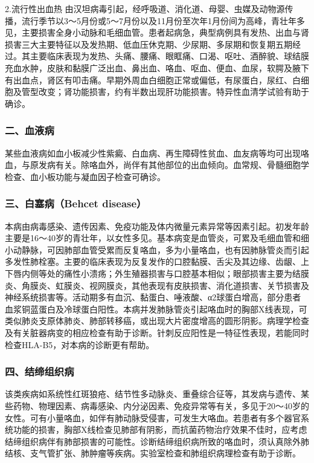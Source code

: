 2.流行性出血热
由汉坦病毒引起，经呼吸道、消化道、母婴、虫媒及动物源传播，流行季节以3～5月份或5～7月份以及11月份至次年1月份间为高峰，青壮年多见，主要损害全身小动脉和毛细血管。患者起病急，典型病例具有发热、出血与肾损害三大主要特征以及发热期、低血压休克期、少尿期、多尿期和恢复期五期经过。其主要临床表现为发热、头痛、腰痛、眼眶痛、口渴、呕吐、酒醉貌、球结膜充血水肿，皮肤和黏膜广泛出血、鼻出血、咯血、呕血、便血、血尿，软腭及腋下有出血点，肾区有叩击痛。早期外周血白细胞正常或偏低，有尿蛋白，尿红、白细胞及管型改变；肾功能损害，约有半数出现肝功能损害。特异性血清学试验有助于确诊。

\subsubsection{二、血液病}

某些血液病如血小板减少性紫癜、白血病、再生障碍性贫血、血友病等均可出现咯血，与原发病有关。除咯血外，尚伴有其他部位的出血倾向。血常规、骨髓细胞学检查、血小板功能与凝血因子检查可确诊。

\subsubsection{三、白塞病（Behcet disease）}

本病由病毒感染、遗传因素、免疫功能及体内微量元素异常等因素引起。初发年龄主要是16～40岁的青壮年，以女性多见。基本病变是血管炎，可累及毛细血管和细小动静脉，可因肺部血管受累而反复咯血，多为小量咯血，也有因肺脉管炎而引起多发性肺栓塞。主要的临床表现为反复发作的口腔黏膜、舌尖及其边缘、齿龈、上下唇内侧等处的痛性小溃疡；外生殖器损害与口腔基本相似；眼部损害主要为结膜炎、角膜炎、虹膜炎、视网膜炎，其他表现有皮肤损害、消化道损害、关节损害及神经系统损害等。活动期多有血沉、黏蛋白、唾液酸、α2球蛋白增高，部分患者血浆铜蓝蛋白及冷球蛋白阳性。本病并发肺脉管炎引起咯血时的胸部X线表现，可类似肺炎支原体肺炎、肺部转移癌，或出现大片密度增高的圆形阴影。病理学检查及有关脏器病变的相应检查有助于诊断。针刺反应阳性是一特征性表现，若能同时检查HLA-B5，对本病的诊断更有帮助。

\subsubsection{四、结缔组织病}

该类疾病如系统性红斑狼疮、结节性多动脉炎、重叠综合征等，其发病与遗传、某些药物、物理因素、病毒感染、内分泌因素、免疫异常等有关，多见于20～40岁的女性。可有小量咯血，如伴有肺动脉受侵害，可发生大咯血。若患者有多个器官系统功能的损害，胸部X线检查见肺部有阴影，而抗菌药物治疗效果不佳时，应考虑结缔组织病伴有肺部损害的可能性。诊断结缔组织病所致的咯血时，须认真除外肺结核、支气管扩张、肺肿瘤等疾病。实验室检查和肺组织病理检查有助于诊断。

